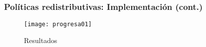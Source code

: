 \documentclass[handout,final,xcolor=dvipsnames]{beamer}
\begin{document}
\begin{frame}\frametitle{Políticas redistributivas: Implementación
    (cont.)}
  \begin{figure}[htbp]
    \centering \vspace{0cm}
    \texttt{[image: progresa01]}
    \caption[Modelo de etapas]{Resultados}
    \label{fig:figura1}
  \end{figure}
\end{frame}
\end{document}

